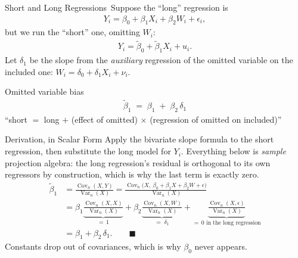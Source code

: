 \documentclass[aspectratio=169,11pt,xcolor=dvipsnames]{beamer}
\DeclareMathOperator{\Cov}{Cov}
\DeclareMathOperator{\Var}{Var}
\newcommand{\core}{\,\raisebox{0.6pt}{\textcolor{corestar}{$\bigstar$}}}
\begin{document}
\begin{frame}{Short and Long Regressions\core}
Suppose the ``long'' regression is
\begin{align*}
  Y_i = \beta_0 + \beta_1 X_i + \beta_2 W_i + \epsilon_i ,
\end{align*}
but we run the ``short'' one, omitting $W_i$:
\begin{align*}
  Y_i = \tilde\beta_0 + \tilde\beta_1 X_i + u_i .
\end{align*}
Let $\delta_1$ be the slope from the \emph{auxiliary} regression of the omitted
variable on the included one: $W_i = \delta_0 + \delta_1 X_i + \nu_i$.
\vskip6pt
\pause
\begin{block}{Omitted variable bias}
\begin{align*}
  \boxed{\;\tilde\beta_1 \;=\; \beta_1 \;+\; \beta_2\,\delta_1\;}
\end{align*}
\centering
\small ``short $=$ long $+$ (effect of omitted) $\times$ (regression of omitted
on included)''
\end{block}
\end{frame}

\begin{frame}{Derivation, in Scalar Form}
Apply the bivariate slope formula to the short regression, then substitute the
long model for $Y_i$. Everything below is \emph{sample} projection algebra: the
long regression's residual is orthogonal to its own regressors by construction,
which is why the last term is exactly zero.
\begin{align*}
  \tilde\beta_1
  &= \frac{\Cov_n(X,Y)}{\Var_n(X)}
   = \frac{\Cov_n\big(X,\ \beta_0 + \beta_1X + \beta_2 W + \epsilon\big)}
          {\Var_n(X)} \\[4pt]
  &= \beta_1\underbrace{\frac{\Cov_n(X,X)}{\Var_n(X)}}_{=\,1}
   + \beta_2\underbrace{\frac{\Cov_n(X,W)}{\Var_n(X)}}_{=\;\delta_1}
   + \underbrace{\frac{\Cov_n(X,\epsilon)}{\Var_n(X)}}_{=\,0
     \text{ in the long regression}} \\[4pt]
  &= \beta_1 + \beta_2\,\delta_1 . \qquad\blacksquare
\end{align*}
\vskip2pt
Constants drop out of covariances, which is why $\beta_0$ never appears.
\end{frame}
\end{document}
